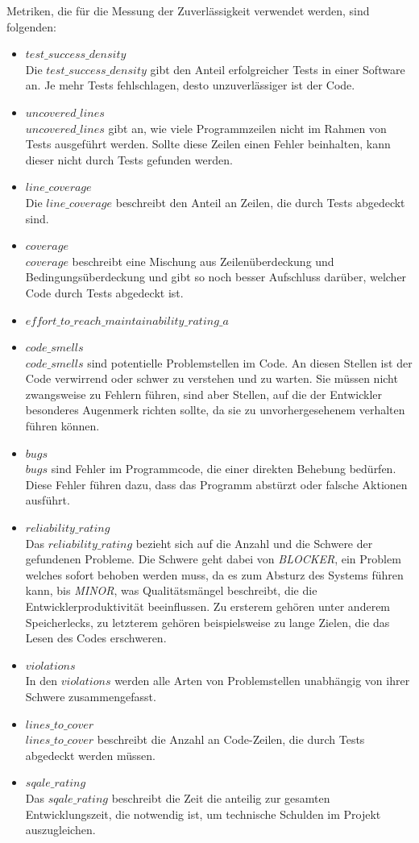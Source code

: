 \documentclass[
	oneside,  %
	ngerman, 
	final, 
	11pt, 
	a4paper, 
	1.1headlines, 
	headinclude=false, 
	footinclude=false, 
	mpinclude=false, 
	pagesize, 
	onecolumn, 
	titlepage, 
	parskip=half, 
	headsepline, 
	chapterprefix=false, 
	version=first, 
	listof=totoc, 
	bibliography=totoc, 
	toc=graduated, 
	fleqn
]{scrbook}
\begin{document}
Metriken, die für die Messung der Zuverlässigkeit verwendet werden, sind folgenden:
\begin{itemize}
	\item $test\_success\_density$\\
	Die $test\_success\_density$ gibt den Anteil erfolgreicher Tests in einer Software an.
	Je mehr Tests fehlschlagen, desto unzuverlässiger ist der Code.
	\item $uncovered\_lines$\\
	$uncovered\_lines$ gibt an, wie viele Programmzeilen nicht im Rahmen von Tests ausgeführt werden.
	Sollte diese Zeilen einen Fehler beinhalten, kann dieser nicht durch Tests gefunden werden.
	\item $line\_coverage$\\
	Die $line\_coverage$ beschreibt den Anteil an Zeilen, die durch Tests abgedeckt sind.
	\item $coverage$\\
	$coverage$ beschreibt eine Mischung aus Zeilenüberdeckung und Bedingungsüberdeckung und gibt so noch besser Aufschluss darüber, welcher Code durch Tests abgedeckt ist.
	\item $effort\_to\_reach\_maintainability\_rating\_a$ %
	\item $code\_smells$\\
	$code\_smells$ sind potentielle Problemstellen im Code.
	An diesen Stellen ist der Code verwirrend oder schwer zu verstehen und zu warten.
	Sie müssen nicht zwangsweise zu Fehlern führen, sind aber Stellen, auf die der Entwickler besonderes Augenmerk richten sollte, da sie zu unvorhergesehenem verhalten führen können.
	\item $bugs$\\
	$bugs$ sind Fehler im Programmcode, die einer direkten Behebung bedürfen.
	Diese Fehler führen dazu, dass das Programm abstürzt oder falsche Aktionen ausführt.
	\item $reliability\_rating$\\
	Das $reliability\_rating$ bezieht sich auf die Anzahl und die Schwere der gefundenen Probleme.
	Die Schwere geht dabei von \textit{BLOCKER}, ein Problem welches sofort behoben werden muss, da es zum Absturz des Systems führen kann, bis \textit{MINOR}, was Qualitätsmängel beschreibt, die die Entwicklerproduktivität beeinflussen.
	Zu ersterem gehören unter anderem Speicherlecks, zu letzterem gehören beispielsweise zu lange Zielen, die das Lesen des Codes erschweren.
	\item $violations$\\
	In den $violations$ werden alle Arten von Problemstellen unabhängig von ihrer Schwere zusammengefasst.
	\item $lines\_to\_cover$\\
	$lines\_to\_cover$ beschreibt die Anzahl an Code-Zeilen, die durch Tests abgedeckt werden müssen.
	\item $sqale\_rating$\\
	Das $sqale\_rating$ beschreibt die Zeit die anteilig zur gesamten Entwicklungszeit, die notwendig ist, um technische Schulden im Projekt auszugleichen.
\end{itemize}
\end{document}
